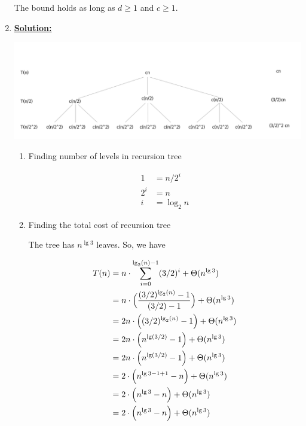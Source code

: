 \documentclass[12pt]{article}
\begin{document}
\begin{enumerate}[1.]
    \bigskip

    The bound holds as long as $d \geq 1$ and $c \geq 1$.

    \item
    \setcounter{equation}{0}

    \bigskip

    \underline{\textbf{Solution:}}

    \bigskip

    \begin{center}
    \includegraphics[width=\linewidth]{images/worksheet_0_solution_4.png}
    \end{center}

    \bigskip

    \begin{enumerate}[1.]

        \item Finding number of levels in recursion tree

        \begin{align}
            1 &= n/2^i\\
            2^i &= n\\
            i &= \log_2 n
        \end{align}

        \item Finding the total cost of recursion tree

        \bigskip

        The tree has $n^{\lg 3}$ leaves. So, we have

        \bigskip

        \begin{align}
            T(n) &= n \cdot \sum\limits_{i=0}^{\lg_2(n) - 1} (3/2)^i + \Theta(n^{\lg 3})\\
            &= n \cdot \Bigl( \frac{(3/2)^{\lg_2(n)} - 1}{(3/2) - 1} \Bigr) + \Theta(n^{\lg 3})\\
            &= 2n \cdot \Bigl((3/2)^{\lg_2(n)} - 1 \Bigr) + \Theta(n^{\lg 3})\\
            &= 2n \cdot \Bigl(n^{\lg (3/2)} - 1 \Bigr) + \Theta(n^{\lg 3})\\
            &= 2n \cdot \Bigl(n^{\lg (3/2)} - 1 \Bigr) + \Theta(n^{\lg 3})\\
            &= 2 \cdot \Bigl(n^{\lg 3 - 1 + 1} - n \Bigr) + \Theta(n^{\lg 3})\\
            &= 2 \cdot \Bigl(n^{\lg 3} - n \Bigr) + \Theta(n^{\lg 3})\\
            &= 2 \cdot \Bigl(n^{\lg 3} - n \Bigr) + \Theta(n^{\lg 3})
        \end{align}


\end{enumerate}
\end{enumerate}
\end{document}
